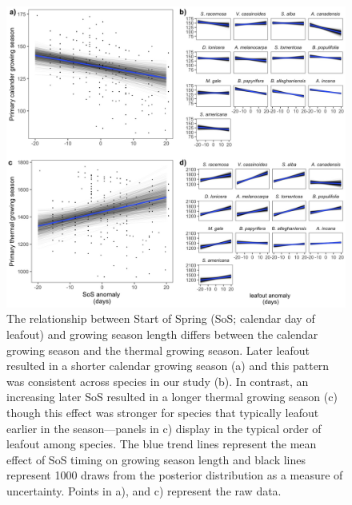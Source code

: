 \documentclass{article}[12pt]
\begin{document}
{%
\begin{figure}[h!]
    \centering
 \includegraphics[width=.8\textwidth]{..//analyses/figures/primarygrowingseason_modplots.jpeg} %
    \caption{The relationship between Start of Spring (SoS; calendar day of leafout) and growing season length differs between the calendar growing season and the thermal growing season. Later leafout resulted in a shorter calendar growing season (a) and this pattern was consistent across species in our study (b). In contrast, an increasing later SoS resulted in a longer thermal growing season (c) though this effect was stronger for species that typically leafout earlier in the season---panels in c) display in the typical order of leafout among species. The blue trend lines represent the mean effect of SoS timing on growing season length and black lines represent 1000 draws from the posterior distribution as a measure of uncertainty. Points in a), and c) represent the raw data.}
    \label{fig:thermcal}
\end{figure}

}
\end{document}
